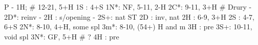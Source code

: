 P - 1H;  # 12-21, 5+H
1S : 4+S
1N*: NF, 5-11, 2-H
2C*: 9-11, 3+H  # Drury
   - 2D*: reinv
   - 2H : s/opening
   - 2S+: nat ST
2D : inv, nat
2H : 6-9, 3+H
2S : 4-7, 6+S
2N*: 8-10, 4+H, some spl
3m*: 8-10, (54+) H and m
3H : pre
3S+: 10-11, void spl
3N*: GF, 5+H  # ?
4H : pre